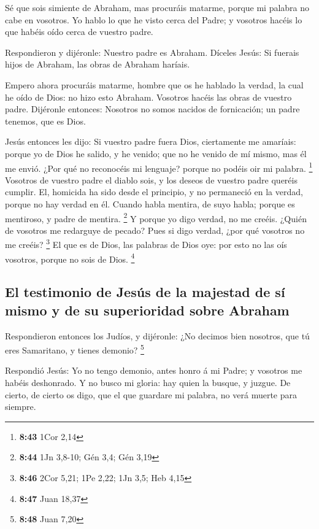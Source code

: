  Sé que sois simiente de Abraham, mas procuráis matarme,
porque mi palabra no cabe en vosotros.  Yo hablo lo que he
visto cerca del Padre; y vosotros hacéis lo que habéis oído cerca de
vuestro padre.

 Respondieron y dijéronle: Nuestro padre es Abraham.
Díceles Jesús: Si fuerais hijos de Abraham, las obras de Abraham
haríais.

 Empero ahora procuráis matarme, hombre que os he hablado
la verdad, la cual he oído de Dios: no hizo esto Abraham. 
Vosotros hacéis las obras de vuestro padre. Dijéronle entonces: Nosotros
no somos nacidos de fornicación; un padre tenemos, que es Dios.

 Jesús entonces les dijo: Si vuestro padre fuera Dios,
ciertamente me amaríais: porque yo de Dios he salido, y he venido; que
no he venido de mí mismo, mas él me envió.  ¿Por qué no
reconocéis mi lenguaje? porque no podéis oir mi palabra. \footnote{\textbf{8:43}
  1Cor 2,14}  Vosotros de vuestro padre el diablo sois, y
los deseos de vuestro padre queréis cumplir. El, homicida ha sido desde
el principio, y no permaneció en la verdad, porque no hay verdad en él.
Cuando habla mentira, de suyo habla; porque es mentiroso, y padre de
mentira. \footnote{\textbf{8:44} 1Jn 3,8-10; Gén 3,4; Gén 3,19}
 Y porque yo digo verdad, no me creéis. 
¿Quién de vosotros me redarguye de pecado? Pues si digo verdad, ¿por qué
vosotros no me creéis? \footnote{\textbf{8:46} 2Cor 5,21; 1Pe 2,22; 1Jn
  3,5; Heb 4,15}  El que es de Dios, las palabras de Dios
oye: por esto no las oís vosotros, porque no sois de Dios. \footnote{\textbf{8:47}
  Juan 18,37}

\hypertarget{el-testimonio-de-jesuxfas-de-la-majestad-de-suxed-mismo-y-de-su-superioridad-sobre-abraham}{%
\subsection{El testimonio de Jesús de la majestad de sí mismo y de su
superioridad sobre
Abraham}\label{el-testimonio-de-jesuxfas-de-la-majestad-de-suxed-mismo-y-de-su-superioridad-sobre-abraham}}

 Respondieron entonces los Judíos, y dijéronle: ¿No decimos
bien nosotros, que tú eres Samaritano, y tienes demonio? \footnote{\textbf{8:48}
  Juan 7,20}

 Respondió Jesús: Yo no tengo demonio, antes honro á mi
Padre; y vosotros me habéis deshonrado.  Y no busco mi
gloria: hay quien la busque, y juzgue.  De cierto, de
cierto os digo, que el que guardare mi palabra, no verá muerte para
siempre.

